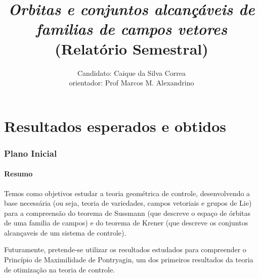 \documentclass[11pt]{amsart}
\newcommand{\<}[0]{\langle}
\renewcommand{\>}[0]{\rangle}
\begin{document}
\title[Órbitas e conjuntos alcançáves]{ \emph{Orbitas e conjuntos alcançáveis de familias de campos  vetores }
\\ \footnotesize{(Relatório Semestral)}}
\author[Caique da Silva Correa, M. Alexandrino]{ Candidato: Caique da Silva Correa  \\orientador: Prof Marcos M. Alexandrino}
\maketitle


\tableofcontents


\part{Resultados esperados e obtidos}

\section{Plano Inicial}

\subsection{Resumo}





Temos como objetivos estudar a teoria geométrica de controle,
desenvolvendo a base necessária (ou seja, teoria de variedades,
campos vetoriais e grupos de Lie) para a compreensão
do teorema de Sussmann (que descreve o espaço de órbitas de uma familia de campos)
e do teorema de Krener (que descreve os conjuntos alcançaveis de um sistema de controle).

Futuramente, pretende-se utilizar os resultados estudados para compreender o Princípio
de Maximilidade de Pontryagin, um dos primeiros resultados da teoria de otimização
na teoria de controle.
\end{document}
